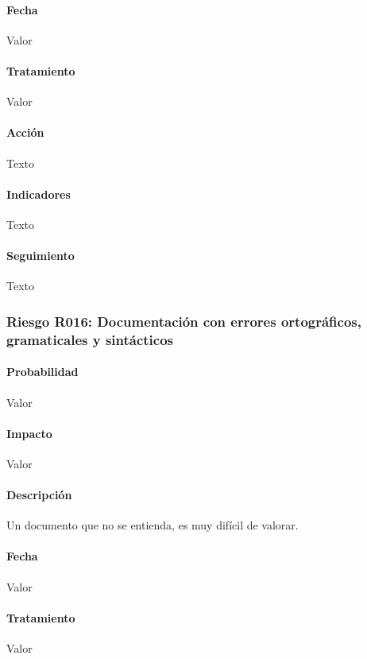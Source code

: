 \documentclass[10pt,a4paper]{article}
\begin{document}
				\paragraph{Fecha} Valor %
				\paragraph{Tratamiento} Valor %
				\paragraph{Acción} Texto %
				\paragraph{Indicadores} Texto %
				\paragraph{Seguimiento}	Texto %
				\subsubsection{Riesgo R016: Documentación con errores ortográficos, gramaticales y sintácticos}
				\paragraph{Probabilidad} Valor
				\paragraph{Impacto}	Valor
				\paragraph{Descripción} Un documento que no se entienda, es muy difícil de valorar.

				\paragraph{Fecha} Valor %
				\paragraph{Tratamiento} Valor %
\end{document}
